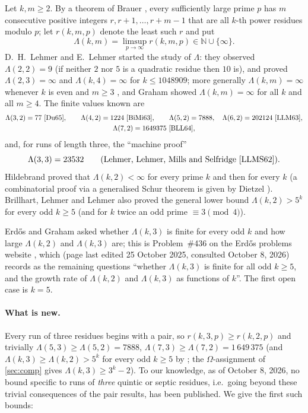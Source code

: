 \documentclass[11pt]{article}
\numberwithin{equation}{section}
\theoremstyle{definition}
\theoremstyle{remark}
\newcommand{\N}{\mathbb N}
\begin{document}
Let $k,m\ge2$. By a theorem of Brauer \cite{Br28}, every sufficiently large prime $p$ has $m$ consecutive
positive integers $r,r+1,\dots,r+m-1$ that are all $k$-th power residues modulo $p$; let
$r(k,m,p)$ denote the least such $r$ and put
\[
  \Lambda(k,m)=\limsup_{p\to\infty} r(k,m,p)\in\N\cup\{\infty\}.
\]
D.~H.~Lehmer and E.~Lehmer \cite{LeLe62} started the study of $\Lambda$: they observed
$\Lambda(2,2)=9$ (if neither $2$ nor $5$ is a quadratic residue then $10$ is), and proved
$\Lambda(2,3)=\infty$ and $\Lambda(k,4)=\infty$ for $k\le 1048909$; more generally $\Lambda(k,m)=\infty$
whenever $k$ is even and $m\ge3$ \cite{LeLe62,LLM63}, and Graham \cite{Gr64} showed
$\Lambda(k,m)=\infty$ for all $k$ and all $m\ge4$.
The finite values known are
\begin{gather*}
\Lambda(3,2)=77\ \text{\cite{Du65}},\qquad \Lambda(4,2)=1224\ \text{\cite{BiMi63}},\qquad
\Lambda(5,2)=7888,\quad \Lambda(6,2)=202124\ \text{\cite{LLM63}},\\
\Lambda(7,2)=1649375\ \text{\cite{BLL64}},
\end{gather*}
and, for runs of length three, the ``machine proof''
\[
  \Lambda(3,3)=23532 \qquad\text{(Lehmer, Lehmer, Mills and Selfridge \cite{LLMS62}).}
\]
Hildebrand proved that $\Lambda(k,2)<\infty$ for every prime $k$ \cite{Hi86} and then for every $k$
\cite{Hi91} (a combinatorial proof via a generalised Schur theorem is given by Dietzel \cite{Di13}).
Brillhart, Lehmer and Lehmer \cite{BLL64} also proved the general lower bound $\Lambda(k,2)>5^k$ for
every odd $k\ge5$ (and for $k$ twice an odd prime $\equiv3\pmod4$).

Erd\H{o}s and Graham \cite[p.~87]{ErGr80} asked whether $\Lambda(k,3)$ is finite for every odd $k$ and how
large $\Lambda(k,2)$ and $\Lambda(k,3)$ are; this is Problem~\#436 on the Erd\H{o}s problems website
\cite{EP436}, which (page last edited 25 October 2025, consulted October 8, 2026) records as the
remaining questions ``whether $\Lambda(k,3)$ is finite for all odd $k\ge5$, and the growth rate of
$\Lambda(k,2)$ and $\Lambda(k,3)$ as functions of $k$''. The first open case is $k=5$.

\paragraph{What is new.}
Every run of three residues begins with a pair, so $r(k,3,p)\ge r(k,2,p)$ and trivially
$\Lambda(5,3)\ge\Lambda(5,2)=7888$, $\Lambda(7,3)\ge\Lambda(7,2)=1\,649\,375$ (and $\Lambda(k,3)\ge\Lambda(k,2)>5^k$
for every odd $k\ge5$ by \cite{BLL64}; the $\Omega$-assignment of \cref{sec:comp} gives
$\Lambda(k,3)\ge3^k-2$). To our knowledge, as of October 8, 2026, no bound specific to runs of
\emph{three} quintic or septic residues, i.e.\ going beyond these trivial consequences of the
pair results, has been published. We give the first such bounds:
\end{document}
